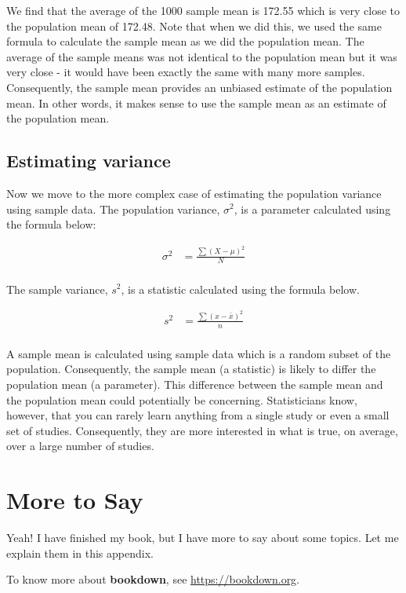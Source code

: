 \documentclass[
]{krantz}
\begin{document}
We find that the average of the 1000 sample mean is 172.55 which is very close to the population mean of 172.48. Note that when we did this, we used the same formula to calculate the sample mean as we did the population mean. The average of the sample means was not identical to the population mean but it was very close - it would have been exactly the same with many more samples. Consequently, the sample mean provides an unbiased estimate of the population mean. In other words, it makes sense to use the sample mean as an estimate of the population mean.

\hypertarget{estimating-variance}{%
\section{Estimating variance}\label{estimating-variance}}

Now we move to the more complex case of estimating the population variance using sample data. The population variance, \(\sigma^2\), is a parameter calculated using the formula below:

\[
\begin{aligned} 
\sigma^2 &= \frac{\sum{(X - \mu)^2}}{N}\\
\end{aligned} 
\]

The sample variance, \(s^2\), is a statistic calculated using the formula below.

\[
\begin{aligned} 
s^2 &= \frac{\sum{(x - \bar{x})^2}}{n}\\
\end{aligned} 
\]

A sample mean is calculated using sample data which is a random subset of the population. Consequently, the sample mean (a statistic) is likely to differ the population mean (a parameter). This difference between the sample mean and the population mean could potentially be concerning. Statisticians know, however, that you can rarely learn anything from a single study or even a small set of studies. Consequently, they are more interested in what is true, on average, over a large number of studies.

\cleardoublepage

\hypertarget{appendix-appendix}{%
\appendix {}}


\hypertarget{more-to-say}{%
\chapter{More to Say}\label{more-to-say}}

Yeah! I have finished my book, but I have more to say about some topics. Let me explain them in this appendix.

To know more about \textbf{bookdown}, see \url{https://bookdown.org}.

  

\backmatter
\printindex
\end{document}
